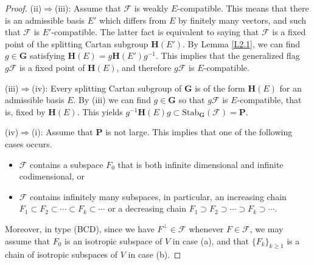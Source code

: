 \documentclass[12pt]{amsart}
\newcommand{\G}{\mathbf{G}}
\renewcommand{\H}{\mathbf{H}}
\renewcommand{\P}{\mathbf{P}}
\newcommand{\Ff}{\mathcal{F}}
\newcommand{\Stab}{\mathrm{Stab}}
\numberwithin{equation}{section}
\theoremstyle{definition}
\begin{document}
\begin{proof}
{\rm (ii)}$\Rightarrow${\rm (iii)}: Assume that $\Ff$ is weakly $E$-compatible. This means that there is an admissible basis $E'$ which differs from $E$ by finitely many vectors, and such that
$\Ff$ is $E'$-compatible. 
The latter fact is equivalent to saying that $\Ff$ is a fixed point of the splitting Cartan subgroup $\H(E')$.
By Lemma \ref{L2.1}, we can find $g\in\G$ satisfying $\H(E)=g\H(E')g^{-1}$. 
This implies that the generalized flag $g\Ff$ is a fixed point of $\H(E)$, and therefore $g\Ff$ is $E$-compatible. 



{\rm (iii)}$\Rightarrow${\rm (iv)}: 
Every splitting Cartan subgroup of $\G$ is of the form
$\H(E)$ for an admissible basis $E$. By {\rm (iii)} we can find $g\in\G$
so that $g\Ff$ is $E$-compatible, that is, fixed by $\H(E)$. 
This yields $g^{-1}\H(E)g\subset\Stab_\G(\Ff)=\P$.


{\rm (iv)}$\Rightarrow${\rm (i)}: Assume that $\P$ is not large. 
This implies that one of the following cases occurs.
\begin{itemize}
\item[(a)] $\Ff$ contains a subspace $F_0$ that is both infinite dimensional and infinite codimensional, or
\item[(b)] $\Ff$ contains infinitely many subspaces, in particular, an increasing chain 
$F_1\subset F_2\subset\cdots\subset F_k\subset\cdots$
or a decreasing chain
$F_1\supset F_2\supset \cdots\supset F_k\supset\cdots$.
\end{itemize}
Moreover, in type (BCD), since we have $F^\perp\in\Ff$ whenever $F\in\Ff$, we may assume that $F_0$ is an isotropic subspace of $V$ in case (a), and that $\{F_k\}_{k\geq 1}$ is a chain of isotropic subspaces of $V$ in case (b).


\end{proof}
\end{document}
